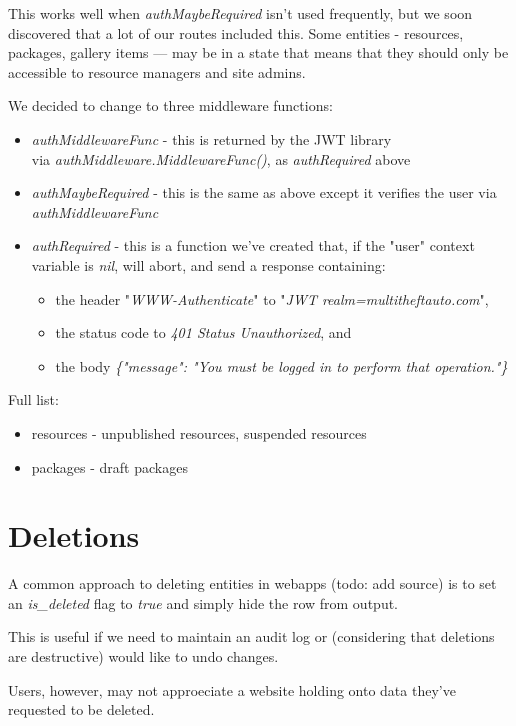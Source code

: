 \documentclass[bsc,frontabs,twoside,singlespacing,parskip,deptreport]{infthesis}     %
\begin{document}
This works well when \emph{authMaybeRequired} isn't used frequently, but we soon discovered that a lot of our routes included this. Some entities - resources, packages, gallery items — may be in a state that means that they should only be accessible to resource managers and site admins.

We decided to change to three middleware functions:
\begin{itemize}
  \item \emph{authMiddlewareFunc} - this is returned by the JWT library \\ via \emph{authMiddleware.MiddlewareFunc()}, as \emph{authRequired} above
  \item \emph{authMaybeRequired} - this is the same as above except it verifies the user via \emph{authMiddlewareFunc}
  \item \emph{authRequired} - this is a function we've created that, if the "user" context variable is \emph{nil}, will abort, and send a response containing:
   \begin{itemize}
     \item the header "\emph{WWW-Authenticate}" to "\emph{JWT realm=multitheftauto.com}",
     \item the status code to \emph{401 Status Unauthorized}, and
     \item the body \emph{\{"message": "You must be logged in to perform that operation."\}}
   \end{itemize}
\end{itemize}

Full list:

\begin{itemize}
  \item resources - unpublished resources, suspended resources
  \item packages - draft packages
\end{itemize}

\section{Deletions}

A common approach to deleting entities in webapps (todo: add source) is to set an \emph{is\_deleted} flag to \emph{true} and simply hide the row from output.

This is useful if we need to maintain an audit log or (considering that deletions
are destructive) would like to undo changes.

Users, however, may not approeciate a website holding onto data they've requested to
be deleted.
\end{document}
